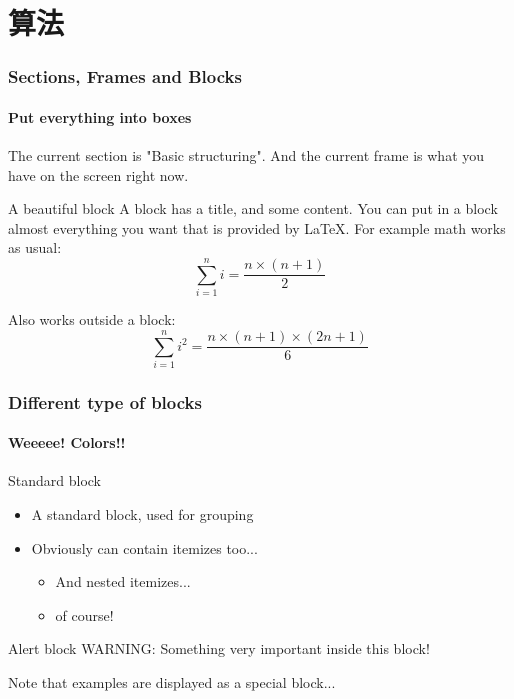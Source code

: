 \documentclass[aspectratio=43,11pt,unknownkeysallowed,UTF8]{beamer}
\begin{document}
\section{算法}
\begin{frame}
  \frametitle{Sections, Frames and Blocks}
  \framesubtitle{Put everything into boxes}

  The current section is "Basic structuring". And the current frame
  is what you have on the screen right now.

  \begin{block}{A beautiful block}
  A block has a title, and some content. You can put in a block
  almost everything you want that is provided by LaTeX. For example
  math works as usual:
    \begin{equation}
    \sum_{i=1}^n i = \frac{n \times (n+1)}{2}
    \end{equation}
  \end{block}

  Also works outside a block:
  \begin{equation}
  \sum_{i=1}^n i^2 = \frac{n \times (n+1) \times (2n+1)}{6}
  \end{equation}
\end{frame}

\begin{frame}
  \frametitle{Different type of blocks}
  \framesubtitle{Weeeee! Colors!!}
  \begin{block}{Standard block}
  \begin{itemize}
    \item A standard block, used for grouping
    \item Obviously can contain itemizes too...
        \begin{itemize}
         \item And nested itemizes...
         \item of course!
        \end{itemize}
  \end{itemize}
  \end{block}
  \begin{alertblock}{Alert block}
  WARNING: Something very important inside this block!
  \end{alertblock}
  \begin{example}
  Note that examples are displayed as a special block...
  \end{example}
\end{frame}
\end{document}
